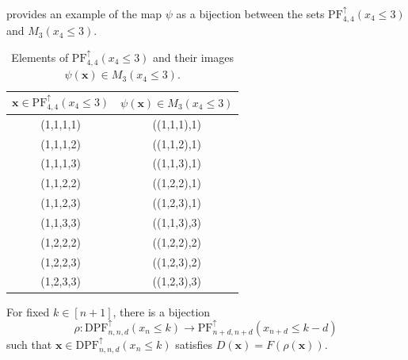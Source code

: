 \documentclass[11pt,reqno]{BICA}
\theoremstyle{definition}
\newcommand{\NDPF}{\mathrm{PF}^{\uparrow}}
\newcommand{\NDDPF}{\mathrm{DPF}^\uparrow}
\newcommand{\x}{\mathbf{x}}
\begin{document}
\begin{example}  provides an example of the map $\psi$ as a bijection between the sets $\NDPF_{4,4}(x_4\leq 3)$ and $M_3(x_4\leq 3)$.

\begin{table}[ht]
    \centering

    \begin{tabular}{|c|c|}\hline
        $\x\in\NDPF_{4,4}(x_4\leq 3)$ & $\psi(\x)\in M_3(x_4\leq 3)$\\ \hline\hline
        (1,1,1,1) & ((1,1,1),1)\\ \hline
        (1,1,1,2) & ((1,1,2),1)\\ \hline
        (1,1,1,3) & ((1,1,3),1)\\ \hline
        (1,1,2,2) & ((1,2,2),1)\\ \hline
        (1,1,2,3) & ((1,2,3),1)\\ \hline
        (1,1,3,3) & ((1,1,3),3)\\ \hline
        (1,2,2,2) & ((1,2,2),2)\\ \hline
        (1,2,2,3) & ((1,2,3),2)\\ \hline
        (1,2,3,3) & ((1,2,3),3)\\ \hline
    \end{tabular}


    \caption{Elements of $\NDPF_{4,4}(x_4\leq 3)$ and their images $\psi(\x)\in M_3(x_4\leq 3)$.}
    \label{tab:psi_example}
\end{table}
\end{example}

\begin{theorem}\label{thm:main-bij}
    For fixed $k \in [n+1]$, there is a bijection
    \[\rho: \NDDPF_{n,n,d}(x_n \leq k) \to \NDPF_{n+d,n+d}(x_{n+d} \leq k-d)\]
    such that $\x \in \NDDPF_{n,n,d}(x_n\leq k)$ satisfies $D(\x) = F(\rho(\x))$.
\end{theorem}
\end{document}
